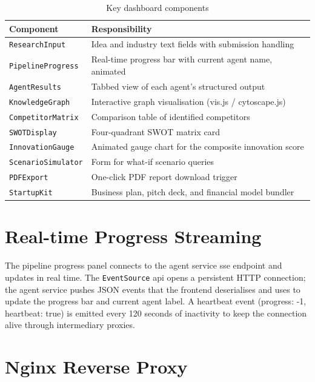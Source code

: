 \documentclass[12pt,a4paper,oneside]{book}
\begin{document}
\begin{table}[H]
\centering
\caption{Key dashboard components}
\label{tab:dashboard_components}
\begin{tabularx}{\textwidth}{lX}
\toprule
\textbf{Component} & \textbf{Responsibility} \\
\midrule
\texttt{ResearchInput}      & Idea and industry text fields with submission handling \\
\texttt{PipelineProgress}   & Real-time progress bar with current agent name, animated \\
\texttt{AgentResults}       & Tabbed view of each agent's structured output \\
\texttt{KnowledgeGraph}     & Interactive graph visualisation (vis.js / cytoscape.js) \\
\texttt{CompetitorMatrix}   & Comparison table of identified competitors \\
\texttt{SWOTDisplay}        & Four-quadrant SWOT matrix card \\
\texttt{InnovationGauge}    & Animated gauge chart for the composite innovation score \\
\texttt{ScenarioSimulator}  & Form for what-if scenario queries \\
\texttt{PDFExport}          & One-click PDF report download trigger \\
\texttt{StartupKit}         & Business plan, pitch deck, and financial model bundler \\
\bottomrule
\end{tabularx}
\end{table}

\section{Real-time Progress Streaming}

The pipeline progress panel connects to the agent service \gls{sse} endpoint and updates in real time. The \texttt{EventSource} \gls{api} opens a persistent HTTP connection; the agent service pushes JSON events that the frontend deserialises and uses to update the progress bar and current agent label. A heartbeat event (progress: -1, heartbeat: true) is emitted every 120 seconds of inactivity to keep the connection alive through intermediary proxies.

\section{Nginx Reverse Proxy}
\end{document}
